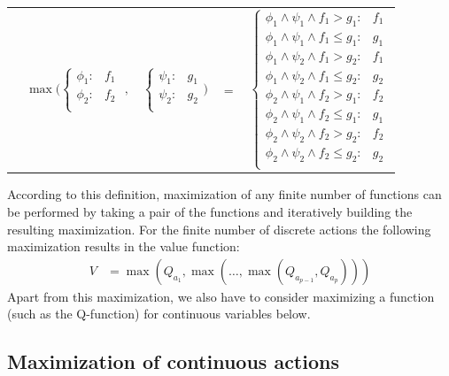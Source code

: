 \documentclass[letterpaper]{article}
\renewcommand{\-}{\text{-}}
\begin{document}
{\footnotesize
\begin{center}
\begin{tabular}{r c c c l}
&
\hspace{-9mm} $\max \Bigg(
  \begin{cases}
    \phi_1: & f_1 \\ 
    \phi_2: & f_2 \\ 
  \end{cases}$
$,$
&
\hspace{-4mm}
  $\begin{cases}
    \psi_1: & g_1 \\ 
    \psi_2: & g_2 \\ 
  \end{cases} \Bigg)$
&
\hspace{-4mm} 
$ = $
&
\hspace{-4mm}
  $\begin{cases}
  \phi_1 \wedge \psi_1 \wedge f_1 > g_1    : & f_1 \\ 
  \phi_1 \wedge \psi_1 \wedge f_1 \leq g_1 : & g_1 \\ 
  \phi_1 \wedge \psi_2 \wedge f_1 > g_2    : & f_1 \\ 
  \phi_1 \wedge \psi_2 \wedge f_1 \leq g_2 : & g_2 \\ 
  \phi_2 \wedge \psi_1 \wedge f_2 > g_1    : & f_2 \\ 
  \phi_2 \wedge \psi_1 \wedge f_2 \leq g_1 : & g_1 \\ 
  \phi_2 \wedge \psi_2 \wedge f_2 > g_2    : & f_2 \\ 
  \phi_2 \wedge \psi_2 \wedge f_2 \leq g_2 : & g_2 \\ 
  \end{cases}$
\end{tabular}
\end{center}
}

According to this definition, maximization of any finite number of functions can be performed by taking a pair of the functions and iteratively building the resulting maximization. For the finite number of discrete actions the following maximization results in the value function: 
\begin{align}
V & 
= \max(Q_{a_1},\max(\ldots, \max (Q_{a_{p-1}},Q_{a_p})))
\end{align}
Apart from this maximization, we also have to consider maximizing a function (such as the Q-function) for continuous variables below.


\subsection{Maximization of continuous actions}
\end{document}
